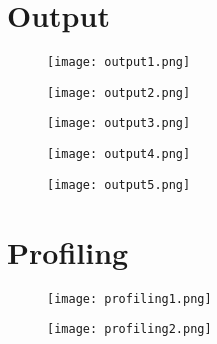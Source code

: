 \documentclass[]{article}
\begin{document}
\pagebreak

\thispagestyle{restpage}
\section{Output}
\begin{figure}[h]
      \begin{center}
      \texttt{[image: output1.png]}
      \end{center}
      \end{figure}
      \begin{figure}[h]
      \begin{center}
      \texttt{[image: output2.png]}
      \end{center}
      \end{figure}
      
 \pagebreak
 \thispagestyle{restpage}
      \begin{figure}[h]
      \begin{center}
      \texttt{[image: output3.png]}
      \end{center}
      \end{figure}
      \begin{figure}[h]
      \begin{center}
      \texttt{[image: output4.png]}
      \end{center}
      \end{figure}
      
  \pagebreak
 \thispagestyle{restpage}
      \begin{figure}[h]
      \begin{center}
      \texttt{[image: output5.png]}
      \end{center}
      \end{figure}
      
   \pagebreak
 \thispagestyle{restpage}
   \section{Profiling}
      \begin{figure}[h]
      \begin{center}
      \texttt{[image: profiling1.png]}
      \end{center}
      \end{figure}
      \begin{figure}[h]
      \begin{center}
      \texttt{[image: profiling2.png]}
      \end{center}
      \end{figure}
      
\end{document}
